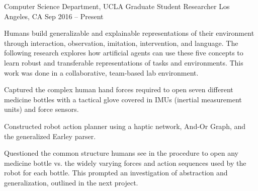 


\begin{cventries}



\cventry
{Computer Science Department, UCLA}
{Graduate Student Researcher}
{Los Angeles, CA}
{Sep 2016 – Present}
{
\begin{flushleft}
Humans build generalizable and explainable representations of their environment through interaction, observation, imitation, intervention, and language. The following research explores how artificial agents can use these five concepts to learn robust and transferable representations of tasks and environments. This work was done in a collaborative, team-based lab environment.
\end{flushleft}
%
\begin{flushleft}
\end{flushleft}
\vspace{-1mm}
\begin{cvitems}
  \item Captured the complex human hand forces required to open seven different medicine bottles with a tactical glove covered in IMUs (inertial measurement units) and force sensors.
  \item Constructed robot action planner using a haptic network, And-Or Graph, and the generalized Earley parser.
  \item Questioned the common structure humans see in the procedure to open any medicine bottle vs. the widely varying forces and action sequences used by the robot for each bottle.  This prompted an investigation of abstraction and generalization, outlined in the next project.
\end{cvitems}
%
\begin{flushleft}

\end{flushleft}}
\end{cventries}
